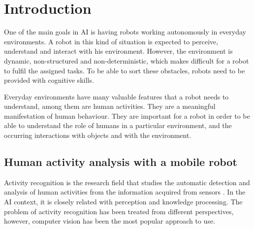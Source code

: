 \chapter{Introduction}

One of the main goals in AI is having robots working autonomously in everyday environments. 
A robot in this kind of situation is expected to perceive, understand and interact with his environment. 
However, the environment is dynamic, non-structured and non-deterministic, which makes difficult for a robot to fulfil the assigned tasks. To be able to sort these obstacles, robots need to be provided with cognitive skills. %

Everyday environments have many valuable features that a robot needs to understand, among them are human activities. 
They are a meaningful manifestation of human behaviour. %
They are important for a robot in order to be able to understand the role of humans in a particular environment, and the occurring interactions with objects and with the environment.

\section{Human activity analysis with a mobile robot}
Activity recognition is the research field that studies the automatic detection and analysis of human activities from the information acquired from sensors \citep{Aggarwal14_HumActRec3DRev}. 
In the AI context, it is closely related with perception and knowledge processing. 
The problem of activity recognition has been treated from different perspectives, however, computer vision has been the most popular approach to use.

